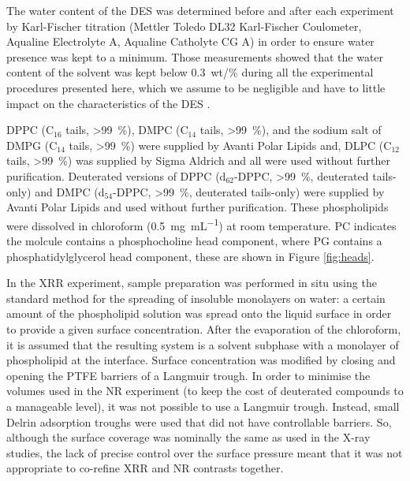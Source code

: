 \documentclass[amsmath,amssymb,twocolumn,superscriptaddress]{revtex4-1}
\begin{document}
The water content of the DES was determined before and after each experiment by Karl-Fischer titration (Mettler Toledo DL32 Karl-Fischer Coulometer, Aqualine Electrolyte A, Aqualine Catholyte CG A) in order to ensure water presence was kept to a minimum.
Those measurements showed that the water content of the solvent was kept below \SI{0.3}{wt/\percent} during all the experimental procedures presented here, which we assume to be negligible and have to little impact on the characteristics of the DES \cite{hammond_liquid_2016,hammond_resilience_2017}.

DPPC (C$_{16}$ tails, \SI{>99}{\percent}), DMPC (C$_{14}$ tails, \SI{>99}{\percent}), and the sodium salt of DMPG (C$_{14}$ tails, \SI{>99}{\percent}) were supplied by Avanti Polar Lipids and, DLPC (C$_{12}$ tails, \SI{>99}{\percent}) was supplied by Sigma Aldrich and all were used without further purification.
Deuterated versions of DPPC (d$_{62}$-DPPC, \SI{>99}{\percent}, deuterated tails-only) and DMPC (d$_{54}$-DPPC, \SI{>99}{\percent}, deuterated tails-only) were supplied by Avanti Polar Lipids and used without further purification.
These phospholipids were dissolved in chloroform (\SI{0.5}{\milli\gram\per\milli\liter}) at room temperature.
PC indicates the molcule contains a phosphocholine head component, where PG contains a phosphatidylglycerol head component, these are shown in Figure \ref{fig:heads}.

In the XRR experiment, sample preparation was performed in situ using the standard method for the spreading of insoluble monolayers on water: a certain amount of the phospholipid solution was spread onto the liquid surface in order to provide a given surface concentration.
After the evaporation of the chloroform, it is assumed that the resulting system is a solvent subphase with a monolayer of phospholipid at the interface.
Surface concentration was modified by closing and opening the PTFE barriers of a Langmuir trough.
In order to minimise the volumes used in the NR experiment (to keep the cost of deuterated compounds to a manageable level), it was not possible to use a Langmuir trough.
Instead, small Delrin adsorption troughs were used that did not have controllable barriers.
So, although the surface coverage was nominally the same as used in the X-ray studies, the lack of precise control over the surface pressure meant that it was not appropriate to co-refine XRR and NR contrasts together.
\end{document}
